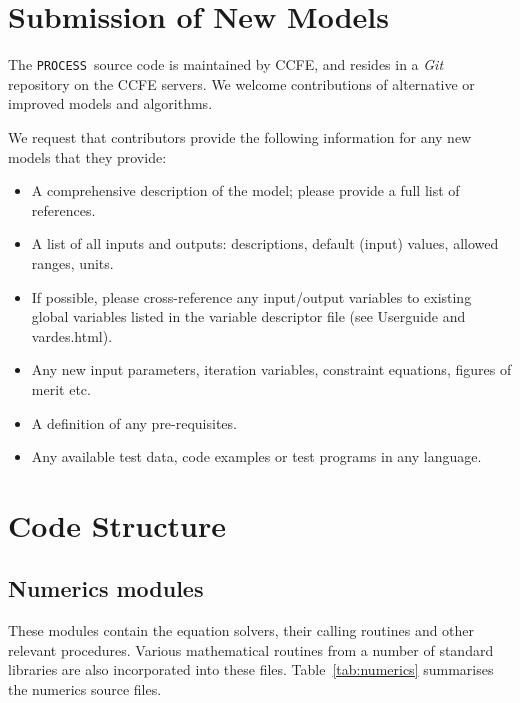 \documentclass[11pt,a4paper]{report}
\newcommand{\process}{\mbox{\texttt{PROCESS}}}
\begin{document}
\section{Submission of New Models}

The \process\ source code is maintained by CCFE, and resides in a
\textit{Git}~\cite{git} repository on the CCFE servers. We welcome
contributions of alternative or improved models and algorithms.

We request that contributors provide the following information for any new models that they provide:

\begin{itemize}

\item A comprehensive description of the model; please provide a full list of
  references.

\item A list of all inputs and outputs: descriptions, default (input) values,
  allowed ranges, units.

\item If possible, please cross-reference any input/output variables to
  existing global variables listed in the variable descriptor file (see Userguide and vardes.html).

\item Any new input parameters, iteration variables, constraint equations, figures of merit etc.

\item A definition of any pre-requisites.

\item Any available test data, code examples or test programs in any language.

\end{itemize}

\section{Code Structure}

\subsection{Numerics modules}
\label{sec:numerics_modules}

These modules contain the equation solvers, their calling routines and other
relevant procedures. Various mathematical routines from a number of standard
libraries are also incorporated into these files. Table~\ref{tab:numerics}
summarises the numerics source files.
\end{document}
